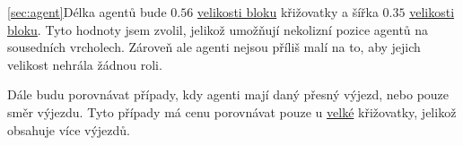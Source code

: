 \ref{sec:agent}Délka agentů bude $0.56$ \hyperref[par:velikost_bloku]{velikosti bloku} křižovatky
a šířka $0.35$ \hyperref[par:velikost_bloku]{velikosti bloku}.
Tyto hodnoty jsem zvolil, jelikož umožňují nekolizní pozice agentů na sousedních vrcholech.
Zároveň ale agenti nejsou příliš malí na to, aby jejich velikost nehrála žádnou roli.

Dále budu porovnávat případy, kdy agenti mají daný přesný výjezd, nebo pouze směr výjezdu.
Tyto případy má cenu porovnávat pouze u
\hyperref[par:data_velka]{velké} křižovatky, jelikož obsahuje více výjezdů.
